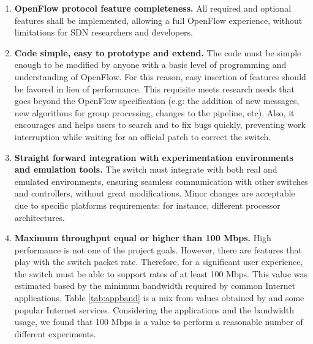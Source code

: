 \begin{enumerate}

\item  \textbf{OpenFlow protocol feature completeness.} All required and optional features shall be implemented, allowing a full OpenFlow experience, without limitations for SDN researchers and developers.   

\item  \textbf{Code simple, easy to prototype and extend.} The code must be simple enough to be modified by anyone with a basic level of programming and understanding of OpenFlow. For this reason, easy insertion of features should be favored in lieu of performance. This requisite meets research needs that goes beyond the OpenFlow specification (e.g: the addition of new messages, new algorithms for group processing, changes to the pipeline, etc). Also, it encourages and helps users to search and to fix bugs quickly, preventing work interruption while waiting for an official patch to correct the switch.       

\item  \textbf{Straight forward integration with experimentation environments and emulation tools.} The switch must integrate with both real and emulated environments, ensuring seamless communication with other switches and controllers, without great modifications. Minor changes are acceptable due to specific platforms requirements: for instance, different processor architectures.

\item \textbf{Maximum throughput equal or higher than 100 Mbps.} High performance is not one of the project goals. However, there are features that play with the switch packet rate. Therefore, for a significant user experience, the switch must be able to support rates of at least 100 Mbps. This value was estimated based by the minimum bandwidth required by common Internet applications. Table \ref{tab:appband} is a mix from values obtained by \cite{Chen:2004:QRN:1234242.1234243} and some popular Internet services. Considering the applications and the bandwidth usage, we found that 100 Mbps is a value to perform a reasonable number of different experiments.          


\end{enumerate}

